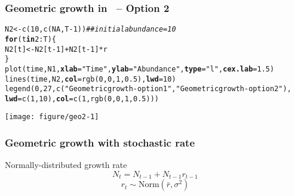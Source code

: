 \documentclass[color=usenames,dvipsnames]{beamer}\usepackage[]{graphicx}\usepackage[]{color}
\makeatletter
\newcommand{\hlnum}[1]{\textcolor[rgb]{0.69,0.494,0}{#1}}%
\newcommand{\hlstr}[1]{\textcolor[rgb]{0.749,0.012,0.012}{#1}}%
\newcommand{\hlcom}[1]{\textcolor[rgb]{0.514,0.506,0.514}{\textit{#1}}}%
\newcommand{\hlopt}[1]{\textcolor[rgb]{0,0,0}{#1}}%
\newcommand{\hlstd}[1]{\textcolor[rgb]{0,0,0}{#1}}%
\newcommand{\hlkwa}[1]{\textcolor[rgb]{0,0,0}{\textbf{#1}}}%
\newcommand{\hlkwb}[1]{\textcolor[rgb]{0,0.341,0.682}{#1}}%
\newcommand{\hlkwc}[1]{\textcolor[rgb]{0,0,0}{\textbf{#1}}}%
\newcommand{\hlkwd}[1]{\textcolor[rgb]{0.004,0.004,0.506}{#1}}%
\newenvironment{kframe}{%
 \def\at@end@of@kframe{}%
 \ifinner\ifhmode%
  \def\at@end@of@kframe{\end{minipage}}%
  \begin{minipage}{\columnwidth}%
 \fi\fi%
 \def\FrameCommand##1{\hskip\@totalleftmargin \hskip-\fboxsep
 \colorbox{shadecolor}{##1}\hskip-\fboxsep
     \hskip-\linewidth \hskip-\@totalleftmargin \hskip\columnwidth}%
 \MakeFramed {\advance\hsize-\width
   \@totalleftmargin\z@ \linewidth\hsize
   \@setminipage}}%
 {\par\unskip\endMakeFramed%
 \at@end@of@kframe}
\newenvironment{knitrout}{}{} %
\makeatother
\begin{document}
\begin{frame}[fragile]
  \frametitle{Geometric growth in \R~-- Option 2}
\begin{knitrout}\tiny
{}\color{fgcolor}\begin{kframe}
\begin{alltt}
\hlstd{N2} \hlkwb{<-} \hlkwd{c}\hlstd{(}\hlnum{10}\hlstd{,} \hlkwd{c}\hlstd{(}\hlnum{NA}\hlstd{, T}\hlopt{-}\hlnum{1}\hlstd{))}  \hlcom{## initial abundance = 10}
\hlkwa{for}\hlstd{(t} \hlkwa{in} \hlnum{2}\hlopt{:}\hlstd{T) \{}
    \hlstd{N2[t]} \hlkwb{<-} \hlstd{N2[t}\hlopt{-}\hlnum{1}\hlstd{]} \hlopt{+} \hlstd{N2[t}\hlopt{-}\hlnum{1}\hlstd{]}\hlopt{*}\hlstd{r}
\hlstd{\}}
\hlkwd{plot}\hlstd{(time, N1,} \hlkwc{xlab}\hlstd{=}\hlstr{"Time"}\hlstd{,} \hlkwc{ylab}\hlstd{=}\hlstr{"Abundance"}\hlstd{,} \hlkwc{type}\hlstd{=}\hlstr{"l"}\hlstd{,} \hlkwc{cex.lab}\hlstd{=}\hlnum{1.5}\hlstd{)}
\hlkwd{lines}\hlstd{(time, N2,} \hlkwc{col}\hlstd{=}\hlkwd{rgb}\hlstd{(}\hlnum{0}\hlstd{,}\hlnum{0}\hlstd{,}\hlnum{1}\hlstd{,}\hlnum{0.5}\hlstd{),} \hlkwc{lwd}\hlstd{=}\hlnum{10}\hlstd{)}
\hlkwd{legend}\hlstd{(}\hlnum{0}\hlstd{,} \hlnum{27}\hlstd{,} \hlkwd{c}\hlstd{(}\hlstr{"Geometric growth - option 1"}\hlstd{,} \hlstr{"Geometric growth - option 2"}\hlstd{),}
       \hlkwc{lwd}\hlstd{=}\hlkwd{c}\hlstd{(}\hlnum{1}\hlstd{,}\hlnum{10}\hlstd{),} \hlkwc{col}\hlstd{=}\hlkwd{c}\hlstd{(}\hlnum{1}\hlstd{,} \hlkwd{rgb}\hlstd{(}\hlnum{0}\hlstd{,}\hlnum{0}\hlstd{,}\hlnum{1}\hlstd{,}\hlnum{0.5}\hlstd{)))}
\end{alltt}
\end{kframe}

{\centering \texttt{[image: figure/geo2-1]} 

}



\end{knitrout}
\end{frame}


\begin{frame}
  \frametitle{Geometric growth with stochastic rate}
  Normally-distributed growth rate
  \[
    N_t = N_{t-1} + N_{t-1}r_{t-1}
  \]
  \[
    r_t \sim \mathrm{Norm}(\bar{r}, \sigma^2)
  \]
\end{frame}
\end{document}
